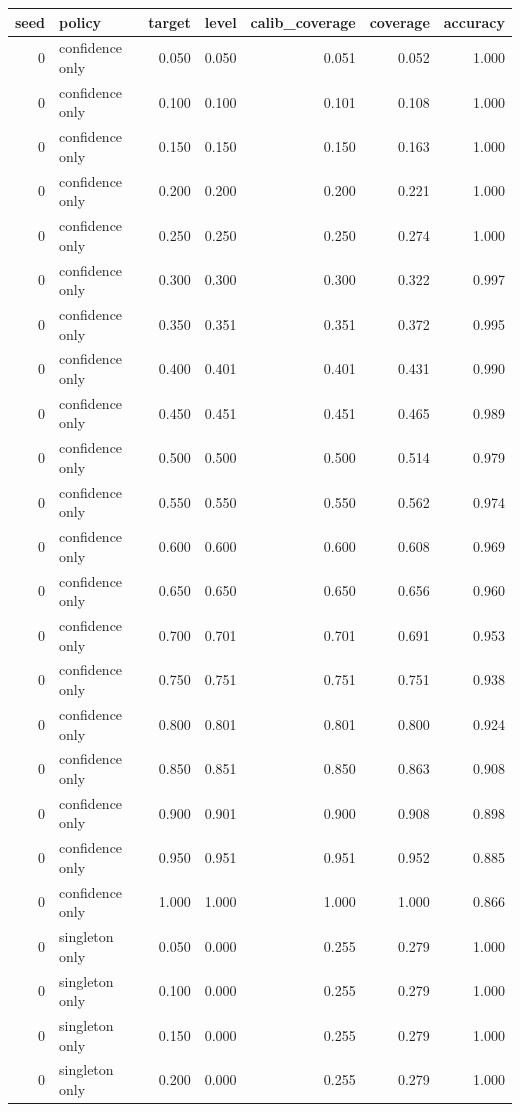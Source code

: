 \begin{tabular}{rlrrrrr}
\toprule
seed & policy & target & level & calib_coverage & coverage & accuracy \\
\midrule
0 & confidence only & 0.050 & 0.050 & 0.051 & 0.052 & 1.000 \\
0 & confidence only & 0.100 & 0.100 & 0.101 & 0.108 & 1.000 \\
0 & confidence only & 0.150 & 0.150 & 0.150 & 0.163 & 1.000 \\
0 & confidence only & 0.200 & 0.200 & 0.200 & 0.221 & 1.000 \\
0 & confidence only & 0.250 & 0.250 & 0.250 & 0.274 & 1.000 \\
0 & confidence only & 0.300 & 0.300 & 0.300 & 0.322 & 0.997 \\
0 & confidence only & 0.350 & 0.351 & 0.351 & 0.372 & 0.995 \\
0 & confidence only & 0.400 & 0.401 & 0.401 & 0.431 & 0.990 \\
0 & confidence only & 0.450 & 0.451 & 0.451 & 0.465 & 0.989 \\
0 & confidence only & 0.500 & 0.500 & 0.500 & 0.514 & 0.979 \\
0 & confidence only & 0.550 & 0.550 & 0.550 & 0.562 & 0.974 \\
0 & confidence only & 0.600 & 0.600 & 0.600 & 0.608 & 0.969 \\
0 & confidence only & 0.650 & 0.650 & 0.650 & 0.656 & 0.960 \\
0 & confidence only & 0.700 & 0.701 & 0.701 & 0.691 & 0.953 \\
0 & confidence only & 0.750 & 0.751 & 0.751 & 0.751 & 0.938 \\
0 & confidence only & 0.800 & 0.801 & 0.801 & 0.800 & 0.924 \\
0 & confidence only & 0.850 & 0.851 & 0.850 & 0.863 & 0.908 \\
0 & confidence only & 0.900 & 0.901 & 0.900 & 0.908 & 0.898 \\
0 & confidence only & 0.950 & 0.951 & 0.951 & 0.952 & 0.885 \\
0 & confidence only & 1.000 & 1.000 & 1.000 & 1.000 & 0.866 \\
0 & singleton only & 0.050 & 0.000 & 0.255 & 0.279 & 1.000 \\
0 & singleton only & 0.100 & 0.000 & 0.255 & 0.279 & 1.000 \\
0 & singleton only & 0.150 & 0.000 & 0.255 & 0.279 & 1.000 \\
0 & singleton only & 0.200 & 0.000 & 0.255 & 0.279 & 1.000 \\

\end{tabular}
